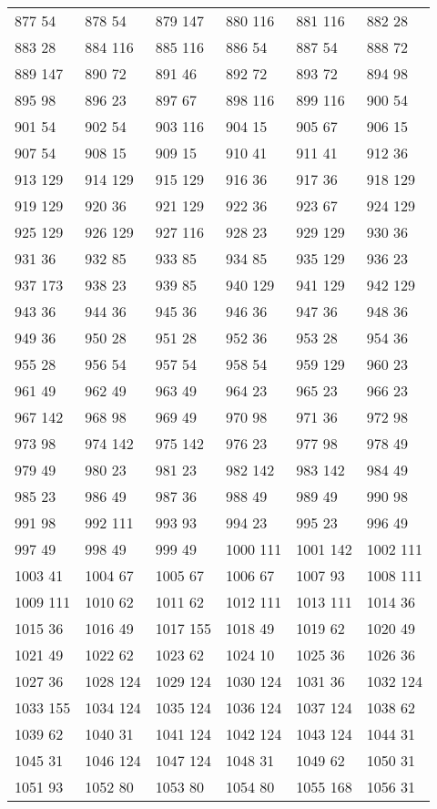 \begin{longtable}{llllll}
877  54&878 54&879 147&880 116&881 116&882 28\\
883  28&884 116&885 116&886 54&887 54&888 72\\
889  147&890 72&891 46&892 72&893 72&894 98\\
895  98&896 23&897 67&898 116&899 116&900 54\\
901  54&902 54&903 116&904 15&905 67&906 15\\
907  54&908 15&909 15&910 41&911 41&912 36\\
913  129&914 129&915 129&916 36&917 36&918 129\\
919  129&920 36&921 129&922 36&923 67&924 129\\
925  129&926 129&927 116&928 23&929 129&930 36\\
931  36&932 85&933 85&934 85&935 129&936 23\\
937  173&938 23&939 85&940 129&941 129&942 129\\
943  36&944 36&945 36&946 36&947 36&948 36\\
949  36&950 28&951 28&952 36&953 28&954 36\\
955  28&956 54&957 54&958 54&959 129&960 23\\
961  49&962 49&963 49&964 23&965 23&966 23\\
967  142&968 98&969 49&970 98&971 36&972 98\\
973  98&974 142&975 142&976 23&977 98&978 49\\
979  49&980 23&981 23&982 142&983 142&984 49\\
985  23&986 49&987 36&988 49&989 49&990 98\\
991  98&992 111&993 93&994 23&995 23&996 49\\
997  49&998 49&999 49&1000 111&1001 142&1002 111\\
1003  41&1004 67&1005 67&1006 67&1007 93&1008 111\\
1009  111&1010 62&1011 62&1012 111&1013 111&1014 36\\
1015  36&1016 49&1017 155&1018 49&1019 62&1020 49\\
1021  49&1022 62&1023 62&1024 10&1025 36&1026 36\\
1027  36&1028 124&1029 124&1030 124&1031 36&1032 124\\
1033  155&1034 124&1035 124&1036 124&1037 124&1038 62\\
1039  62&1040 31&1041 124&1042 124&1043 124&1044 31\\
1045  31&1046 124&1047 124&1048 31&1049 62&1050 31\\
1051  93&1052 80&1053 80&1054 80&1055 168&1056 31\\

\end{longtable}
